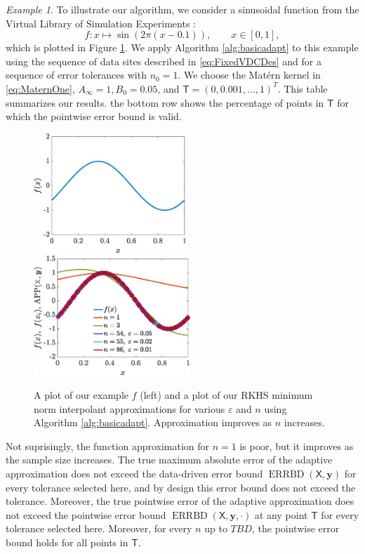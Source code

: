 \documentclass[]{mcom-l}
\theoremstyle{theorem}
\theoremstyle{remark}
\newtheorem{example}{Example}
\DeclareMathOperator{\errBd}{ERRBD}
\newcommand{\mT}{\mathsf{T}}
\newcommand{\mX}{\mathsf{X}}
\newcommand{\by}{{\boldsymbol{y}}}
\begin{document}
\begin{example}
	\label{ex:adpsamplesize}
	To illustrate our algorithm, we consider a sinusoidal function \cite{CurEtal88b} from the Virtual Library of Simulation Experiments \cite{VirLib17a}:
	\begin{equation}
	f: x \mapsto  \sin(2\pi(x-0.1)), \qquad x \in [0,1],
	\end{equation}
	which is plotted in Figure \ref{fig:ex1}.  We apply Algorithm \ref{alg:basicadapt} to this example using the sequence of data sites described in \eqref{eq:FixedVDCDes} and for a sequence of error tolerances with
	$n_0 = 1$.  We choose the Mat\'ern kernel in \eqref{eq:MaternOne},  $A_\infty = 1, B_0 = 0.05$, and $\mT = (0, 0.001, \ldots, 1)^T$.  This table summarizes our results.  the bottom row shows the percentage of points in $\mT$ for which the pointwise error bound is valid.
	
	
	
	\begin{figure}[H]
		\centering
		\includegraphics[height = 4.5cm]{ProgramsImages/CurrinSineFunPlot.eps} \qquad
		\includegraphics[height = 4.5cm]{ProgramsImages/Alg1_CurrinSineFun_Matern_adapt_th_EmpBayesAx_theta_1.eps}
		\caption{A plot of our example $f$ (left) and a plot of our RKHS minimum norm interpolant approximations for various $\varepsilon$ and  $n$ using Algorithm \ref{alg:basicadapt}.  Approximation improves as $n$ increases. \label{fig:ex1}}
	\end{figure}
	
Not suprisingly, the function approximation for $n=1$ is poor, but it improves as the sample size increases.  The true  maximum absolute error of the adaptive approximation does not exceed the data-driven error bound $\errBd(\mX,\by)$ for every tolerance selected here, and by design this error bound does not exceed the tolerance.  Moreover, the true pointwise error of the adaptive approximation does not exceed the pointwise error bound $\errBd(\mX,\by,\cdot)$ at any point $\mT$ for every tolerance selected here.  Moreover, for every $n$ up to $TBD$, the pointwise error bound holds for all points in  $\mT$.
	
\end{example} 
\end{document}
